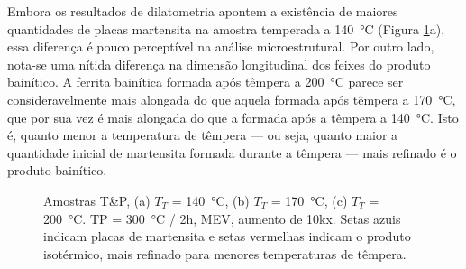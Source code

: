Embora os resultados de dilatometria apontem a existência de maiores quantidades de placas martensita na amostra temperada a \SI{140}{\degreeCelsius} (Figura \ref{fig:TP300MEV}a), essa diferença é pouco perceptível na análise microestrutural. Por outro lado, nota-se uma nítida diferença na dimensão longitudinal dos feixes do produto bainítico. A ferrita bainítica formada após têmpera a \SI{200}{\degreeCelsius} parece ser consideravelmente mais alongada do que aquela formada após têmpera a \SI{170}{\degreeCelsius}, que por sua vez é mais alongada do que a formada após a têmpera a \SI{140}{\degreeCelsius}. Isto é, quanto menor a temperatura de têmpera --- ou seja, quanto maior a quantidade inicial de martensita formada durante a têmpera --- mais refinado é o produto bainítico.



\begin{figure}
  \centering
  \quad
  \vspace{0pt}
  \caption{Amostras T\&P, (a) $T_T$ = \SI{140}{\degreeCelsius}, (b) $T_T$ = \SI{170}{\degreeCelsius}, (c) $T_T$ = \SI{200}{\degreeCelsius}. TP = \SI{300}{\degreeCelsius} / 2h, MEV, aumento de 10kx. Setas azuis indicam placas de martensita e setas vermelhas indicam o produto isotérmico, mais refinado para menores temperaturas de têmpera.}
  \label{fig:TP300MEV}
\end{figure}

